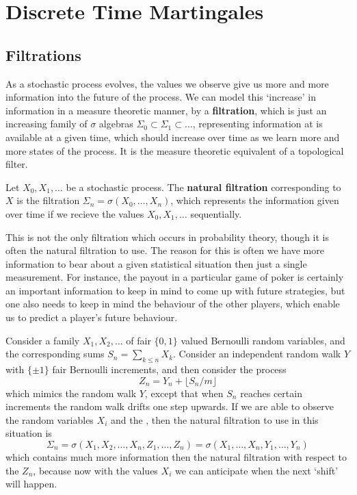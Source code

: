 \chapter{Discrete Time Martingales}

\section{Filtrations}

As a stochastic process evolves, the values we observe give us more and more information into the future of the process. We can model this `increase' in information in a measure theoretic manner, by a {\bf filtration}, which is just an increasing family of $\sigma$ algebras $\Sigma_0 \subset \Sigma_1 \subset \dots$, representing information at is available at a given time, which should increase over time as we learn more and more states of the process. It is the measure theoretic equivalent of a topological filter.

\begin{example}
    Let $X_0, X_1, \dots$ be a stochastic process. The {\bf natural filtration} corresponding to $X$ is the filtration $\Sigma_n = \sigma(X_0, \dots, X_n)$, which represents the information given over time if we recieve the values $X_0, X_1, \dots$ sequentially.
\end{example}

This is not the only filtration which occurs in probability theory, though it is often the natural filtration to use. The reason for this is often we have more information to bear about a given statistical situation then just a single measurement. For instance, the payout in a particular game of poker is certainly an important information to keep in mind to come up with future strategies, but one also needs to keep in mind the behaviour of the other players, which enable us to predict a player's future behaviour.

\begin{example}
    Consider a family $X_1, X_2, \dots$ of fair $\{ 0,1 \}$ valued Bernoulli random variables, and the corresponding sums $S_n = \sum_{k \leq n} X_k$. Consider an independent random walk $Y$ with $\{ \pm 1 \}$ fair Bernoulli increments, and then consider the process
    \[ Z_n = Y_n + \lfloor S_n/m \rfloor \]
    which mimics the random walk $Y$, except that when $S_n$ reaches certain increments the random walk drifts one step upwards. If we are able to observe the random variables $X_i$ and the , then the natural filtration to use in this situation is
    \[ \Sigma_n = \sigma(X_1,X_2,\dots,X_n,Z_1, \dots, Z_n) = \sigma(X_1,\dots,X_n,Y_1,\dots,Y_n) \]
    which contains much more information then the natural filtration with respect to the $Z_n$, because now with the values $X_i$ we can anticipate when the next `shift' will happen.
\end{example}

